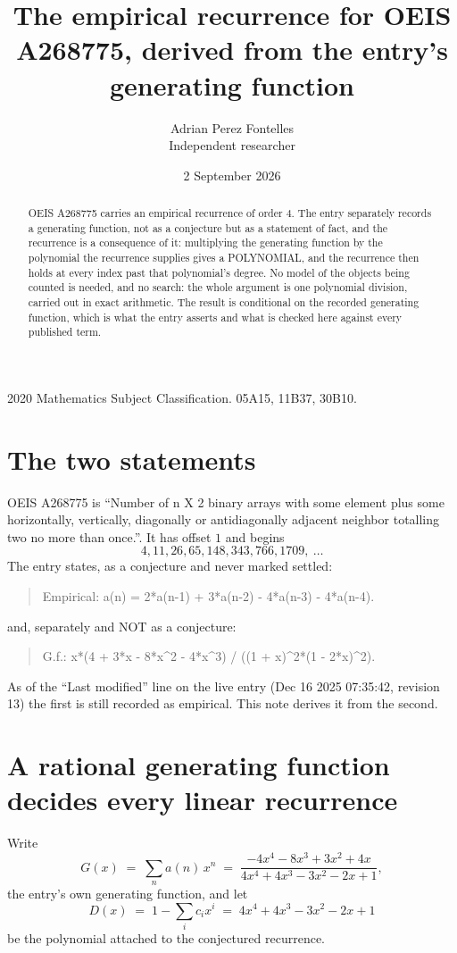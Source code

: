 \documentclass[11pt,a4paper]{article}
\title{The empirical recurrence for OEIS A268775, derived from the entry's generating function}
\author{Adrian Perez Fontelles\\ \small Independent researcher}
\date{2 September 2026}
\theoremstyle{plain}
\theoremstyle{definition}
\begin{document}
\maketitle

\begin{abstract}
OEIS A268775 carries an empirical recurrence of order $4$. The entry separately records a
generating function, not as a conjecture but as a statement of fact, and the recurrence is a
consequence of it: multiplying the generating function by the polynomial the recurrence
supplies gives a POLYNOMIAL, and the recurrence then holds at every index past that
polynomial's degree. No model of the objects being counted is needed, and no search: the
whole argument is one polynomial division, carried out in exact arithmetic. The result is
conditional on the recorded generating function, which is what the entry asserts and what is
checked here against every published term.
\end{abstract}

\noindent\small 2020 Mathematics Subject Classification. 05A15, 11B37, 30B10.\normalsize

\section{The two statements}

OEIS A268775 is ``Number of n X 2 binary arrays with some element plus some horizontally, vertically, diagonally or antidiagonally adjacent neighbor totalling two no more than once.''. It has offset $1$ and begins
\[
4, 11, 26, 65, 148, 343, 766, 1709,\ \dots
\]
The entry states, as a conjecture and never marked settled:
\begin{quote}
Empirical: a(n) = 2*a(n-1) + 3*a(n-2) - 4*a(n-3) - 4*a(n-4).
\end{quote}
and, separately and NOT as a conjecture:
\begin{quote}
G.f.: x*(4 + 3*x - 8*x\^{}2 - 4*x\^{}3) / ((1 + x)\^{}2*(1 - 2*x)\^{}2).
\end{quote}
As of the ``Last modified'' line on the live entry (Dec 16 2025 07:35:42, revision 13) the first is still
recorded as empirical. This note derives it from the second.

\section{A rational generating function decides every linear recurrence}

Write
\[
G(x)\;=\;\sum_{n}a(n)\,x^{n}\;=\;\frac{- 4 x^{4} - 8 x^{3} + 3 x^{2} + 4 x}{4 x^{4} + 4 x^{3} - 3 x^{2} - 2 x + 1},
\]
the entry's own generating function, and let
\[
D(x)\;=\;1-\sum_i c_i x^{i}\;=\;4 x^{4} + 4 x^{3} - 3 x^{2} - 2 x + 1
\]
be the polynomial attached to the conjectured recurrence.
\end{document}
